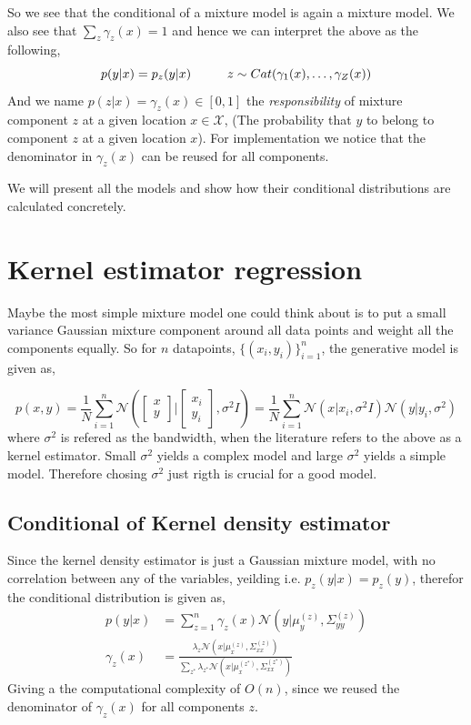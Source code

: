 So we see that the conditional of a mixture model is again a mixture model. 
We also see that $\sum_z \gamma_z(x) = 1$ and hence we can interpret the above as the following, 
$$p(y|x) = p_z(y|x)  \hspace*{1cm} z \sim Cat(\gamma_1(x), \dots, \gamma_Z(x)) $$ And we name
$p(z|x) = \gamma_z(x) \in [0,1]$ the \textit{responsibility} of mixture component $z$ at a given
location $x \in \mathcal{X}$, (The probability that $y$ to belong to component $z$ at a given
location $x$). For implementation we notice that the denominator in $\gamma_z(x)$ can be reused for
all components. 

We will present all the models and show how their conditional distributions are calculated concretely.


\section{Kernel estimator regression}
Maybe the most simple mixture model one could think about is to put a small variance Gaussian mixture
component around all data points and weight all the components equally. So for $n$ datapoints,
$\{(x_i,y_i)\}_{i=1}^n$, the generative model is given as, 

$$p(x,y) = \frac{1}{N} \sum_{i=1}^n \mathcal{N}\left(\begin{bmatrix}x\\y\end{bmatrix} |
\begin{bmatrix}x_i\\y_i\end{bmatrix}, \sigma^2 I \right) = \frac{1}{N} \sum_{i=1}^n 
\mathcal{N}(x|x_i, \sigma^2 I)\mathcal{N}(y|y_i, \sigma^2) $$
where $\sigma^2$ is refered as the bandwidth, when the literature refers to the above as a kernel estimator. 
Small $\sigma^2$ yields a complex model and large $\sigma^2$ yields a simple model. Therefore chosing $\sigma^2$
just rigth is crucial for a good model. 

\subsection{Conditional of Kernel density estimator}
Since the kernel density estimator is just a Gaussian mixture model, with no correlation between
any of the variables, yeilding i.e. $p_z(y|x) = p_z(y)$, therefor the conditional distribution is
given as, 
\begin{align}
    p(y|x) &= \sum_{z=1}^n \gamma_z(x) \mathcal{N}(y|\mu_{y}^{(z)},\Sigma_{yy}^{(z)} )\\
    \gamma_z(x) &= \frac{\lambda_z \mathcal{N}(x|\mu_{x}^{(z)},\Sigma_{xx}^{(z)})}{\sum_{z^*}
\lambda_{z^*} \mathcal{N}(x|\mu_{x}^{(z^*)},\Sigma_{xx}^{(z^*)})}
\end{align}
Giving a the computational complexity of $O(n)$, since we reused the denominator of 
$\gamma_z(x)$ for all components $z$. 

